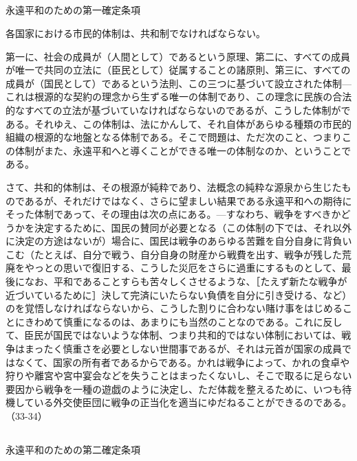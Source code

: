 \subsection{}



永遠平和のための第一確定条項

各国家における市民的体制は、共和制でなければならない。

第一に、社会の成員が（人間として）であるという原理、第二に、すべての成員が唯一で共同の立法に（臣民として）従属することの諸原則、第三に、すべての成員が（国民として）であるという法則、この三つに基づいて設立された体制{\——}これは根源的な契約の理念から生ずる唯一の体制であり、この理念に民族の合法的なすべての立法が基づいていなければならないのであるが、こうした体制がである。それゆえ、この体制は、法にかんして、それ自体があらゆる種類の市民的組織の根源的な地盤となる体制である。そこで問題は、ただ次のこと、つまりこの体制がまた、永遠平和へと導くことができる唯一の体制なのか、ということである。

さて、共和的体制は、その根源が純粋であり、法概念の純粋な源泉から生じたものであるが、それだけではなく、さらに望ましい結果である永遠平和への期待にそった体制であって、その理由は次の点にある。{\——}すなわち、戦争をすべきかどうかを決定するために、国民の賛同が必要となる（この体制の下では、それ以外に決定の方途はないが）場合に、国民は戦争のあらゆる苦難を自分自身に背負いこむ（たとえば、自分で戦う、自分自身の財産から戦費を出す、戦争が残した荒廃をやっとの思いで復旧する、こうした災厄をさらに過重にするものとして、最後になお、平和であることすらも苦々しくさせるような、［たえず新たな戦争が近づいているために］決して完済にいたらない負債を自分に引き受ける、など）のを覚悟しなければならないから、こうした割りに合わない賭け事をはじめることにきわめて慎重になるのは、あまりにも当然のことなのである。これに反して、臣民が国民ではないような体制、つまり共和的ではない体制においては、戦争はまったく慎重さを必要としない世間事であるが、それは元首が国家の成員ではなくて、国家の所有者であるからである。かれは戦争によって、かれの食卓や狩りや離宮や宮中宴会などを失うことはまったくないし、そこで取るに足らない要因から戦争を一種の遊戯のように決定し、ただ体裁を整えるために、いつも待機している外交使臣団に戦争の正当化を適当にゆだねることができるのである。（33-34）

\subsection{}


永遠平和のための第二確定条項

